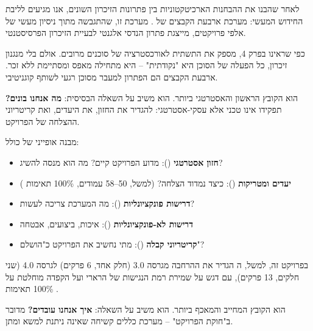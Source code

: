 

לאחר שהבנו את ההבחנות הארכיטקטוניות בין פתרונות הזיכרון השונים, אנו מגיעים לליבת החידוש המעשי: מערכת ארבעת הקבצים של . מערכת זו, שהתגבשה מתוך ניסיון מעשי של אלפי פרויקטים, מייצגת פתרון הנדסי אלגנטי לבעיית הזיכרון הפרסיסטנטי.

כפי שראינו בפרק \num{4},  מספק את התשתית לאורכסטרציה של סוכנים מרובים. אולם בלי מנגנון זיכרון, כל הפעלה של הסוכן היא "נקודתית" – היא מתחילה מאפס ומסתיימת ללא זכר. ארבעת הקבצים הם הפתרון למעבר מסוכן רגעי לשותף קוגניטיבי.


\textbf{} הוא הקובץ הראשון והאסטרטגי ביותר. הוא משיב על השאלה הבסיסית: \textbf{מה אנחנו בונים?} תפקידו אינו טכני אלא עסקי-אסטרטגי: להגדיר את החזון, את היעדים, ואת קריטריוני ההצלחה של הפרויקט.

מבנה אופייני של  כולל:
\begin{itemize}
  \item \textbf{חזון אסטרטגי} (): מדוע הפרויקט קיים? מה הוא מנסה להשיג?
  \item \textbf{יעדים ומטריקות} (): כיצד נמדוד הצלחה? (למשל, \num{50}–\num{58} עמודים, \num{100}\% תאימות )
  \item \textbf{דרישות פונקציונליות} (): מה המערכת צריכה לעשות?
  \item \textbf{דרישות לא-פונקציונליות} (): איכות, ביצועים, אבטחה
  \item \textbf{קריטריוני קבלה} (): מתי נחשיב את הפרויקט כ"הושלם"?
\end{itemize}

בפרויקט זה, למשל, ה הגדיר את ההרחבה מגרסה \num{3.0} (חלק אחד, \num{6} פרקים) לגרסה \num{4.0} (שני חלקים, \num{13} פרקים), עם דגש על שמירת רמת הנגישות של הרארי ועל הקפדה מוחלטת על \num{100}\% תאימות .


\textbf{} הוא הקובץ המחייב והמאכף ביותר. הוא משיב על השאלה: \textbf{איך אנחנו עובדים?} מדובר ב"חוקת הפרויקט" – מערכת כללים קשיחה שאינה ניתנת למשא ומתן.

